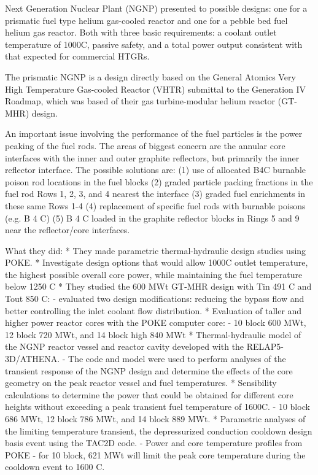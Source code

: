 Next Generation Nuclear Plant (NGNP) presented to possible designs: one for a prismatic fuel type helium gas-cooled reactor and one for a pebble bed fuel helium gas reactor.
Both with three basic requirements: a coolant outlet temperature of 1000C, passive safety, and a total power output consistent with that expected for commercial HTGRs.

The prismatic NGNP is a design directly based on the General Atomics Very High Temperature Gas-cooled Reactor (VHTR) submittal to the Generation IV Roadmap, which was based of their gas turbine-modular helium reactor (GT-MHR) design.

An important issue involving the performance of the fuel particles is the power peaking of the fuel rods.
The areas of biggest concern are the annular core interfaces with the inner and outer graphite reflectors, but primarily the inner reflector interface.
The possible solutions are:
(1) use of allocated B4C burnable poison rod locations in the fuel blocks
(2) graded particle packing fractions in the fuel rod Rows 1, 2, 3, and 4 nearest the interface
(3) graded fuel enrichments in these same Rows 1-4
(4) replacement of specific fuel rods with burnable poisons (e.g. B 4 C)
(5) B 4 C loaded in the graphite reflector blocks in Rings 5 and 9 near the reflector/core interfaces.

What they did:
* They made parametric thermal-hydraulic design studies using POKE.
* Investigate design options that would allow 1000C outlet temperature, the highest possible overall core power, while maintaining the fuel temperature below 1250 C
* They studied the 600 MWt GT-MHR design with Tin 491 C and Tout 850 C:
	- evaluated two design modifications: reducing the bypass flow and better controlling the inlet coolant flow distribution.
* Evaluation of taller and higher power reactor cores with the POKE computer core:
	- 10 block 600 MWt, 12 block 720 MWt, and 14 block high 840 MWt
* Thermal-hydraulic model of the NGNP reactor vessel and reactor cavity developed with the RELAP5-3D/ATHENA.
	- The code and model were used to perform analyses of the transient response of the NGNP design and determine the effects of the core geometry on the peak reactor vessel and fuel temperatures.
* Sensibility calculations to determine the power that could be obtained for different core heights without exceeding a peak transient fuel temperature of 1600C.
	- 10 block 686 MWt, 12 block 786 MWt, and 14 block 889 MWt.
* Parametric analyses of the limiting temperature transient, the depressurized conduction cooldown design basis event using the TAC2D code.
	- Power and core temperature profiles from POKE
	- for 10 block, 621 MWt will limit the peak core temperature during the cooldown event to 1600 C.

